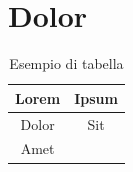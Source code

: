 \lipsum[4]

\section{Dolor}
\lipsum[3]

\begin{table}
\centering
\begin{tabular}{|c|c|}
\hline
\textbf{Lorem} & \textbf{Ipsum} \\
\hline
\hline
Dolor & Sit \\
\hline
Amet &  \\
\hline
\end{tabular}
\caption{Esempio di tabella}
\label{tab:example}
\end{table}

\lipsum[4-5]